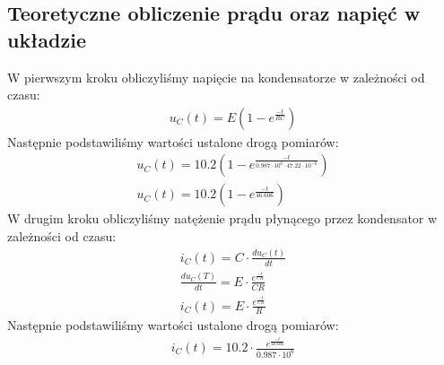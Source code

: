 \documentclass[polish,polish,a4paper]{article}
\begin{document}
\subsection{Teoretyczne obliczenie prądu oraz napięć w układzie}

W pierwszym kroku obliczyliśmy napięcie na kondensatorze w zależności od czasu:
\begin{gather}
u_C(t) = E(1 - e^{\frac{-t}{RC}})
\end{gather}
Następnie podstawiliśmy wartości ustalone drogą pomiarów:
\begin{gather}
u_C(t) = 10.2(1 - e^{\frac{-t}{0.987 \cdot 10^6 \cdot 47.22 \cdot 10^{-6}}}) \\
u_C(t) = 10.2(1 - e^{\frac{-t}{46.606}})
\end{gather}
W drugim kroku obliczyliśmy natężenie prądu płynącego przez kondensator w zależności od czasu: \cite{openstax}
\begin{gather}
i_C(t) = C \cdot \frac{du_C(t)}{dt} \\
\frac{du_C(T)}{dt} = E \cdot \frac{e^{\frac{-t}{CR}}}{CR} \\
i_C(t) = E \cdot \frac{e^{\frac{-t}{CR}}}{R}
\end{gather}
Następnie podstawiliśmy wartości ustalone drogą pomiarów:
\begin{gather}
i_C(t) = 10.2 \cdot \frac{e^{\frac{-t}{46.606}}}{0.987 \cdot 10^6}
\end{gather}

\newpage
\end{document}
